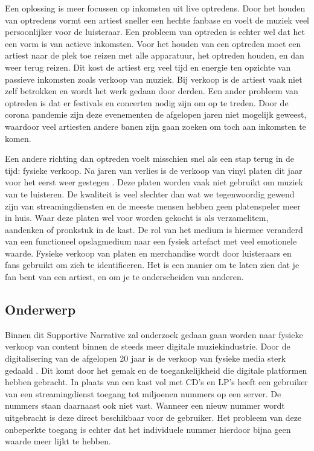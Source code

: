 Een oplossing is meer focussen op inkomsten uit live optredens. Door het houden van optredens vormt een artiest sneller een hechte fanbase en voelt de muziek veel persoonlijker voor de luisteraar. Een probleem van optreden is echter wel dat het een vorm is van actieve inkomsten. Voor het houden van een optreden moet een artiest naar de plek toe reizen met alle apparatuur, het optreden houden, en dan weer terug reizen. Dit kost de artiest erg veel tijd en energie ten opzichte van passieve inkomsten zoals verkoop van muziek. Bij verkoop is de artiest vaak niet zelf betrokken en wordt het werk gedaan door derden. Een ander probleem van optreden is dat er festivals en concerten nodig zijn om op te treden. Door de corona pandemie zijn deze evenementen de afgelopen jaren niet mogelijk geweest, waardoor veel artiesten andere banen zijn gaan zoeken om toch aan inkomsten te komen.

Een andere richting dan optreden voelt misschien snel als een stap terug in de tijd: fysieke verkoop. Na jaren van verlies is de verkoop van vinyl platen dit jaar voor het eerst weer gestegen \cite{year_end_2022_RIAA_revenue_statistics}. Deze platen worden vaak niet gebruikt om muziek van te luisteren. De kwaliteit is veel slechter dan wat we tegenwoordig gewend zijn van streamingdiensten en de meeste mensen hebben geen platenspeler meer in huis. Waar deze platen wel voor worden gekocht is als verzamelitem, aandenken of pronkstuk in de kast. De rol van het medium is hiermee veranderd van een functioneel opslagmedium naar een fysiek artefact met veel emotionele waarde. Fysieke verkoop van platen en merchandise wordt door luisteraars en fans gebruikt om zich te identificeren. Het is een manier om te laten zien dat je fan bent van een artiest, en om je te onderscheiden van anderen.

\subsection{Onderwerp}
Binnen dit Supportive Narrative zal onderzoek gedaan gaan worden naar fysieke verkoop van content binnen de steeds meer digitale muziekindustrie. Door de digitalisering van de afgelopen 20 jaar is de verkoop van fysieke media sterk gedaald \cite{dong2022valueofmusic}. Dit komt door het gemak en de toegankelijkheid die digitale platformen hebben gebracht. In plaats van een kast vol met CD's en LP's heeft een gebruiker van een streamingdienst toegang tot miljoenen nummers op een server. De nummers staan daarnaast ook niet vast. Wanneer een nieuw nummer wordt uitgebracht is deze direct beschikbaar voor de gebruiker. Het probleem van deze onbeperkte toegang is echter dat het individuele nummer hierdoor bijna geen waarde meer lijkt te hebben.

